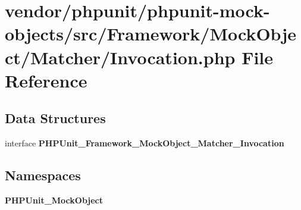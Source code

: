\section{vendor/phpunit/phpunit-\/mock-\/objects/src/\+Framework/\+Mock\+Object/\+Matcher/\+Invocation.php File Reference}
\label{_matcher_2_invocation_8php}
\subsection*{Data Structures}
\begin{DoxyCompactItemize}
\item 
interface {\bf P\+H\+P\+Unit\+\_\+\+Framework\+\_\+\+Mock\+Object\+\_\+\+Matcher\+\_\+\+Invocation}
\end{DoxyCompactItemize}
\subsection*{Namespaces}
\begin{DoxyCompactItemize}
\item 
 {\bf P\+H\+P\+Unit\+\_\+\+Mock\+Object}
\end{DoxyCompactItemize}
